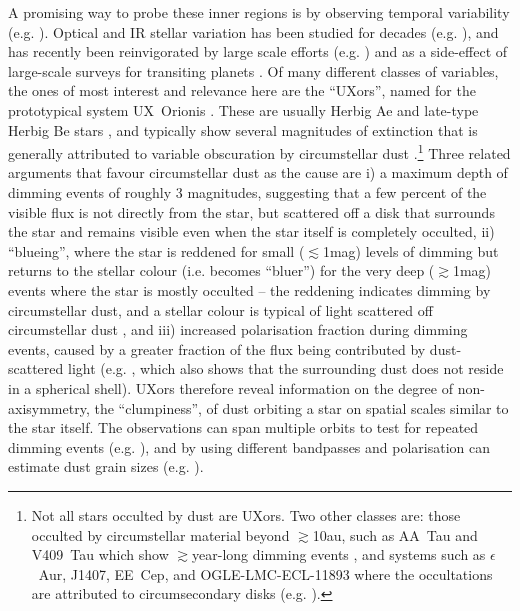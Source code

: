 \documentclass[]{rsos}
\begin{document}
A promising way to probe these inner regions is by observing temporal variability
(e.g. \cite{2014Sci...345.1032M}). Optical and IR stellar variation has been studied for
decades (e.g. \cite{1945ApJ...102..168J,1994AJ....108.1906H}), and has recently been
reinvigorated by large scale efforts
(e.g. \cite{2011ApJ...733...50M,2014AJ....147...82C}) and as a side-effect of large-scale
surveys for transiting planets \cite{2012AJ....143...72M,2013AJ....146..112R}. Of many
different classes of variables, the ones of most interest and relevance here are the
``UXors'', named for the prototypical system UX~Orionis \cite{1994AJ....108.1906H}. These
are usually Herbig Ae and late-type Herbig Be stars \cite{1984A&AS...55..109F}, and
typically show several magnitudes of extinction that is generally attributed to variable
obscuration by circumstellar dust
\cite{1994AJ....108.1906H,1999AJ....118.1043H,2000A&A...364..633N}.\footnote{Not all
  stars occulted by dust are UXors. Two other classes are: those occulted by
  circumstellar material beyond $\gtrsim$10au, such as AA~Tau and V409~Tau which show
  $\gtrsim$year-long dimming events \cite{2013A&A...557A..77B,2015AJ....150...32R}, and
  systems such as $\epsilon$~Aur, J1407, EE~Cep, and OGLE-LMC-ECL-11893 where the
  occultations are attributed to circumsecondary disks
  (e.g. \cite{1999MNRAS.303..521M,2012AJ....143...72M,2014ApJ...788...41D,2015ApJS..220...14K}).}
Three related arguments that favour circumstellar dust as the cause are i) a maximum
depth of dimming events of roughly 3 magnitudes, suggesting that a few percent of the
visible flux is not directly from the star, but scattered off a disk that surrounds the
star and remains visible even when the star itself is completely occulted, ii)
``blueing'', where the star is reddened for small ($\lesssim$1mag) levels of dimming but
returns to the stellar colour (i.e. becomes ``bluer'') for the very deep ($\gtrsim$1mag)
events where the star is mostly occulted -- the reddening indicates dimming by
circumstellar dust, and a stellar colour is typical of light scattered off circumstellar
dust \cite{1988SvAL...14...27G}, and iii) increased polarisation fraction during dimming
events, caused by a greater fraction of the flux being contributed by dust-scattered
light (e.g. \cite{2001ARep...45...51R}, which also shows that the surrounding dust does
not reside in a spherical shell). UXors therefore reveal information on the degree of
non-axisymmetry, the ``clumpiness'', of dust orbiting a star on spatial scales similar to
the star itself. The observations can span multiple orbits to test for repeated dimming
events (e.g. \cite{1999A&A...349..619B}), and by using different bandpasses and
polarisation can estimate dust grain sizes
(e.g. \cite{1988SvAL...14...27G,1994ASPC...62...63G}).
\end{document}
